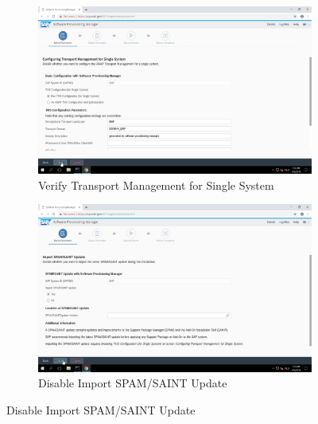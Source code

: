 \begin{figure}[!htb]\ContinuedFloat
    \begin{subfigure}{0.5\textwidth}
        \captionsetup{width=0.8\linewidth}
        \includegraphics[width=0.9\linewidth]{img/Methodologie/SAP08.png}
        \centering
        \caption{Verify Transport Management for Single System}
    \end{subfigure}
    \begin{subfigure}{0.5\textwidth}
        \captionsetup{width=0.8\linewidth}
        \includegraphics[width=0.9\linewidth]{img/Methodologie/SAP07.png} 
        \centering
        \caption{Disable Import SPAM/SAINT Update}
    \end{subfigure}
\end{figure}
